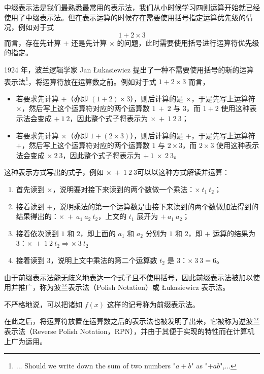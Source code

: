         中缀表示法是我们最熟悉最常用的表示法，我们从小时候学习四则运算开始就已经使用了中缀表示法。但在表示运算的时候存在需要使用括号指定运算优先级的情况，例如对于式 \[1 + 2 \times 3\] 而言，存在先计算 $+$ 还是先计算 $\times$ 的问题，此时需要使用括号进行运算符优先级的指定。

        1924 年，波兰逻辑学家 Jan {\L}ukasiewicz 提出了一种不需要使用括号的新的运算表示法\footnote{... Should we write down the sum of two numbers "$a+b$" as "$+ab$",...\cite{lukasiewicz-1929}}，将运算符放在运算数之前。例如对于式 $1 + 2 \times 3$ 而言，
        \begin{itemize}
            \item 若要求先计算 $+$（亦即 $(1 + 2) \times 3$），则后计算的是 $\times$，于是先写上运算符 $\times$，然后写上这个运算符对应的两个运算数 $1\ +\ 2$ 与 $3$，而 $1 + 2$ 使用这种表示法会变成 $+\ 1\ 2$，因此整个式子将表示为 $\times\ +\ 1\ 2\ 3$；
            \item 若要求先计算 $\times$（亦即 $1 + (2 \times 3)$），则后计算的是 $+$，于是先写上运算符 $+$，然后写上这个运算符对应的两个运算数 $1$ 与 $2 \times 3$，而 $2 \times 3$ 使用这种表示法会变成 $\times\ 2\ 3$，因此整个式子将表示为 $+\ 1\ \times\ 2\ 3$。
        \end{itemize}
        这种表示方式写出的式子，例如 $\times\ +\ 1\ 2\ 3$可以以这种方式解读并运算：
        \begin{enumerate}
            \item 首先读到 $\times$，说明要对接下来读到的两个数做一个乘法：$\times\ t_1\ t_2$；
            \item 接着读到 $+$，说明乘法的第一个运算数是由接下来读到的两个数做加法得到的结果得出的：$\times\ +\ a_1\ a_2\ t_2$，上文的 $t_1$ 展开为 $+\ a_1\ a_2$；
            \item 接着依次读到 $1$ 和 $2$，即上面的 $a_1$ 和 $a_2$ 分别为 $1$ 和 $2$，即 $+$ 运算的结果为 $3$：$\times\ +\ 1\ 2\ t_2 \Rightarrow \times\ 3\ t_2$
            \item 接着读到 $3$，说明上文中乘法的第二个运算数 $t_2$ 是 $3$：$\times\ 3\ 3 = 6$。
        \end{enumerate}

        由于前缀表示法能无歧义地表达一个式子且不使用括号，因此前缀表示法被加以使用并推广，称为波兰表示法（Polish Notation）或 {\L}ukasiewicz 表示法。

        不严格地说，可以把诸如 $f(x)$ 这样的记号称为前缀表示法。

        在此之后，将运算符放置在运算数之后的表示法也被发明了出来，它被称为逆波兰表示法（Reverse Polish Notation，RPN），并由于其便于实现的特性而在计算机上广为运用。
